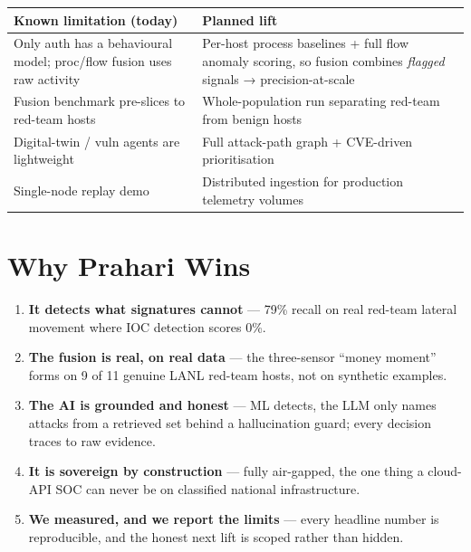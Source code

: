 \documentclass[11pt,a4paper]{article}
\begin{document}
\begin{center}
\begin{tabularx}{\linewidth}{@{}L{5.2cm} Y@{}}
\toprule
\textbf{Known limitation (today)} & \textbf{Planned lift} \\
\midrule
Only auth has a behavioural model; proc/flow fusion uses raw activity & Per-host process baselines + full flow anomaly scoring, so fusion combines \emph{flagged} signals → precision-at-scale \\
Fusion benchmark pre-slices to red-team hosts & Whole-population run separating red-team from benign hosts \\
Digital-twin / vuln agents are lightweight & Full attack-path graph + CVE-driven prioritisation \\
Single-node replay demo & Distributed ingestion for production telemetry volumes \\
\bottomrule
\end{tabularx}
\end{center}

\section{Why Prahari Wins}

\begin{keybox}
\begin{enumerate}[leftmargin=1.5em,itemsep=3pt]
  \item \textbf{It detects what signatures cannot} — 79\% recall on real red-team lateral
        movement where IOC detection scores 0\%.
  \item \textbf{The fusion is real, on real data} — the three-sensor ``money moment'' forms on
        9 of 11 genuine LANL red-team hosts, not on synthetic examples.
  \item \textbf{The AI is grounded and honest} — ML detects, the LLM only names attacks from a
        retrieved set behind a hallucination guard; every decision traces to raw evidence.
  \item \textbf{It is sovereign by construction} — fully air-gapped, the one thing a cloud-API
        SOC can never be on classified national infrastructure.
  \item \textbf{We measured, and we report the limits} — every headline number is reproducible,
        and the honest next lift is scoped rather than hidden.
\end{enumerate}
\end{keybox}
\end{document}
